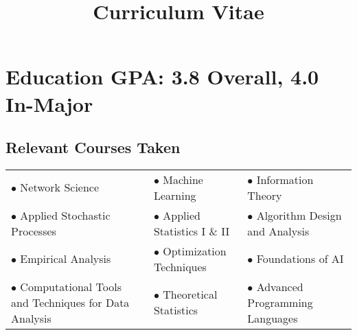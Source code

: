 \documentclass[11pt,a4paper,sans]{moderncv} %
\title{Curriculum Vitae}
\begin{document}


%
%
%
%
%


\makecvtitle %


\section{Education  \hfill \normalsize GPA: 3.8 Overall, 4.0 In-Major}

\subsection{Relevant Courses Taken}
\begin{center}
\begin{tabularx}{\linewidth}{ X X X }
 $\bullet$ Network Science &  $\bullet$ Machine Learning & $\bullet$ Information Theory  \\ 
 $\bullet$ Applied Stochastic Processes & $\bullet$ Applied Statistics I \& II  & $\bullet$ Algorithm Design and Analysis  \\
  $\bullet$ Empirical Analysis & $\bullet$ Optimization Techniques & $\bullet$ Foundations of AI  \\  
 $\bullet$ Computational Tools and \; \mbox{Techniques} for Data Analysis &  $\bullet$ Theoretical Statistics & $\bullet$ Advanced Programming Languages

\end{tabularx}
\end{center}
\end{document}
